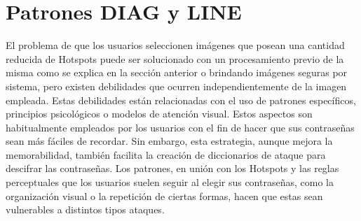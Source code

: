 \documentclass[12pt]{report}
\begin{document}
	

	
	
	
	

\section{Patrones DIAG y LINE}


El problema de que los usuarios seleccionen imágenes que posean una cantidad reducida de Hotspots puede ser solucionado con un procesamiento previo de la misma como se explica en la sección anterior o brindando imágenes seguras por sistema, pero existen debilidades que ocurren independientemente de la imagen empleada. Estas debilidades están relacionadas con el uso de patrones específicos, principios psicológicos o modelos de atención visual. Estos aspectos son habitualmente empleados por los usuarios con el fin de hacer que sus contraseñas sean más fáciles de recordar. Sin embargo, esta estrategia, aunque mejora la memorabilidad, también facilita la creación de diccionarios de ataque para descifrar las contraseñas. Los patrones, en unión con los Hotspots y las reglas perceptuales que los usuarios suelen seguir al elegir sus contraseñas, como la organización visual o la repetición de ciertas formas, hacen que estas sean vulnerables a distintos tipos  ataques.


\end{document}
